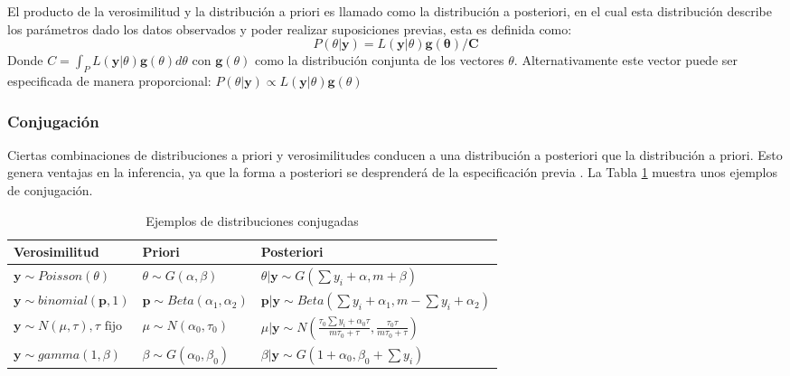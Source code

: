 El producto de la verosimilitud y la distribución a priori es llamado como la distribución a posteriori, en el cual esta distribución describe los parámetros dado los datos observados y poder realizar suposiciones previas, esta es definida como:
$$
P(\theta | \mathbf{y}) = L(\mathbf{y} | \theta)\mathbf{g(\theta)/C}
$$
Donde $C = \int_{P}^{}L(\mathbf{y}|\theta)\mathbf{g}(\theta)d\theta$ con $\mathbf{g}(\theta)$ como la distribución conjunta de los vectores $\theta$. Alternativamente este vector puede ser especificada de manera proporcional: $P(\theta | \mathbf{y}) \propto L (\mathbf{y} | \theta)\mathbf{g}(\theta)$

\subsubsection{Conjugación}
Ciertas combinaciones de distribuciones a priori y verosimilitudes conducen a una distribución a posteriori que la distribución a priori. Esto genera ventajas en la inferencia, ya que la forma a posteriori se desprenderá de la especificación previa \parencite{lawson2018bayesian}. La Tabla \ref{tabla:distribuciones} muestra unos ejemplos de conjugación.

\begin{table}[htb]
\centering
\begin{tabular}{|p{4cm}|p{4cm}|p{7cm}|}
\hline
\textbf{Verosimilitud} & \textbf{Priori}& \textbf{Posteriori} \\ \hline
$\mathbf{y} \sim Poisson(\theta)$ & $\theta \sim G(\alpha, \beta)$ & $\theta|\mathbf{y} \sim G(\sum{y}_{i} + \alpha,m + \beta)$ \\
$\mathbf{y} \sim binomial(\mathbf{p},1)$ & $\mathbf{p} \sim Beta({\alpha}_{1}, {\alpha}_{2})$ & $\mathbf{p}|\mathbf{y} \sim Beta(\sum{y}_{i} + {\alpha}_{1},m - \sum {y}_{i} + {\alpha}_{2})$ \\
$\mathbf{y} \sim N(\mu, \tau), \tau \text{ fijo}$ & $\mu \sim N({\alpha}_{0}, {\tau}_{0})$ & $\mu|\mathbf{y} \sim N\left( \frac{{\tau}_{0}\sum {y}_{i} + {\alpha}_{0} \tau}{m {\tau}_{0} + \tau}, \frac{{\tau}_{0}\tau}{m{\tau}_{0}+\tau} \right)$ \\
$\mathbf{y} \sim gamma(1,\beta)$ & $\beta \sim G({\alpha}_{0}, {\beta}_{0})$ & $\beta|\mathbf{y} \sim G(1 + {\alpha}_{0}, {\beta}_{0} + \sum{y}_{i})$ \\
\hline
\end{tabular}
\caption{Ejemplos de distribuciones conjugadas}
\label{tabla:distribuciones}
\end{table}

